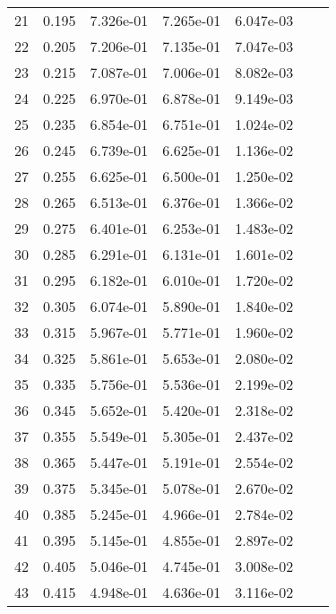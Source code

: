 \begin{table}[ht]
\begin{tabular}{rcccccc}
    21 &  0.195 &       7.326e-01 &       7.265e-01  &        6.047e-03\\ 
    22 &  0.205 &       7.206e-01 &       7.135e-01  &        7.047e-03\\ 
    23 &  0.215 &       7.087e-01 &       7.006e-01  &        8.082e-03\\ 
    24 &  0.225 &       6.970e-01 &       6.878e-01  &        9.149e-03\\ 
    25 &  0.235 &       6.854e-01 &       6.751e-01  &        1.024e-02\\ 
    26 &  0.245 &       6.739e-01 &       6.625e-01  &        1.136e-02\\ 
    27 &  0.255 &       6.625e-01 &       6.500e-01  &        1.250e-02\\ 
    28 &  0.265 &       6.513e-01 &       6.376e-01  &        1.366e-02\\ 
    29 &  0.275 &       6.401e-01 &       6.253e-01  &        1.483e-02\\ 
    30 &  0.285 &       6.291e-01 &       6.131e-01  &        1.601e-02\\ 
    31 &  0.295 &       6.182e-01 &       6.010e-01  &        1.720e-02\\ 
    32 &  0.305 &       6.074e-01 &       5.890e-01  &        1.840e-02\\ 
    33 &  0.315 &       5.967e-01 &       5.771e-01  &        1.960e-02\\ 
    34 &  0.325 &       5.861e-01 &       5.653e-01  &        2.080e-02\\ 
    35 &  0.335 &       5.756e-01 &       5.536e-01  &        2.199e-02\\ 
    36 &  0.345 &       5.652e-01 &       5.420e-01  &        2.318e-02\\ 
    37 &  0.355 &       5.549e-01 &       5.305e-01  &        2.437e-02\\ 
    38 &  0.365 &       5.447e-01 &       5.191e-01  &        2.554e-02\\ 
    39 &  0.375 &       5.345e-01 &       5.078e-01  &        2.670e-02\\ 
    40 &  0.385 &       5.245e-01 &       4.966e-01  &        2.784e-02\\ 
    41 &  0.395 &       5.145e-01 &       4.855e-01  &        2.897e-02\\ 
    42 &  0.405 &       5.046e-01 &       4.745e-01  &        3.008e-02\\ 
    43 &  0.415 &       4.948e-01 &       4.636e-01  &        3.116e-02\\ 

\end{tabular}
\end{table}
